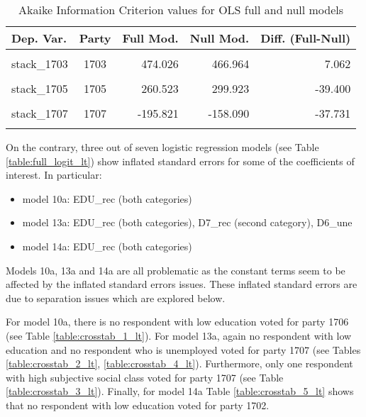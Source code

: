 \documentclass[
]{article}
\providecommand{\tightlist}{%
  \setlength{\itemsep}{0pt}\setlength{\parskip}{0pt}}
\begin{document}
\begin{table}[!h]

\caption{\label{tab:unnamed-chunk-109}Akaike Information Criterion values for OLS full and null models 
        \label{table:ols_aic_lt}}
\centering
\begin{tabular}[t]{lcrrr}
\toprule
Dep. Var. & Party & Full Mod. & Null Mod. & Diff. (Full-Null)\\
\midrule
\cellcolor{gray!6}{stack\_1701} & \cellcolor{gray!6}{1701} & \cellcolor{gray!6}{596.205} & \cellcolor{gray!6}{636.971} & \cellcolor{gray!6}{-40.766}\\
stack\_1703 & 1703 & 474.026 & 466.964 & 7.062\\
\cellcolor{gray!6}{stack\_1706} & \cellcolor{gray!6}{1706} & \cellcolor{gray!6}{263.609} & \cellcolor{gray!6}{290.702} & \cellcolor{gray!6}{-27.093}\\
stack\_1705 & 1705 & 260.523 & 299.923 & -39.400\\
\cellcolor{gray!6}{stack\_1704} & \cellcolor{gray!6}{1704} & \cellcolor{gray!6}{58.720} & \cellcolor{gray!6}{92.687} & \cellcolor{gray!6}{-33.967}\\
\addlinespace
stack\_1707 & 1707 & -195.821 & -158.090 & -37.731\\
\cellcolor{gray!6}{stack\_1702} & \cellcolor{gray!6}{1702} & \cellcolor{gray!6}{502.026} & \cellcolor{gray!6}{515.036} & \cellcolor{gray!6}{-13.009}\\
\bottomrule
\end{tabular}
\end{table}

On the contrary, three out of seven logistic regression models (see Table \ref{table:full_logit_lt}) show
inflated standard errors for some of the coefficients of interest. In particular:

\begin{itemize}
\tightlist
\item
  model 10a: EDU\_rec (both categories)
\item
  model 13a: EDU\_rec (both categories), D7\_rec (second category), D6\_une
\item
  model 14a: EDU\_rec (both categories)
\end{itemize}

Models 10a, 13a and 14a are all problematic as the constant terms seem to be affected by the inflated standard errors issues. These inflated standard errors are due to separation issues which are explored below.

For model 10a, there is no respondent with low education voted for party 1706 (see Table \ref{table:crosstab_1_lt}).
For model 13a, again no respondent with low education and no respondent who is unemployed voted for party 1707 (see Tables \ref{table:crosstab_2_lt}, \ref{table:crosstab_4_lt}). Furthermore, only one respondent with high subjective social class voted for party 1707 (see Table \ref{table:crosstab_3_lt}).
Finally, for model 14a Table \ref{table:crosstab_5_lt} shows that no respondent with low education voted for party 1702.
\end{document}
